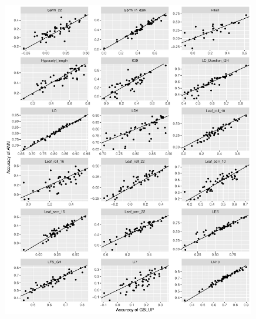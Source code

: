 \begin{figure}[H]
  \centering \includegraphics[height=0.99\textheight, width=0.99\textwidth]{Figures/cor_plots_4}
  \decoRule
 \label{fig:bla}
\end{figure}

